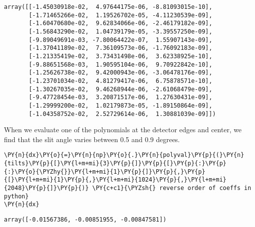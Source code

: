 \begin{tcolorbox}[breakable, size=fbox, boxrule=.5pt, pad at break*=1mm, opacityfill=0]
\begin{Verbatim}[commandchars=\\\{\}]
array([[-1.45030918e-02,  4.97644175e-06, -8.81093015e-10],
       [-1.71465266e-02,  1.19526702e-05, -4.11230539e-09],
       [-1.60470680e-02,  9.62834066e-06, -2.46179182e-09],
       [-1.56843290e-02,  1.04739179e-05, -3.39557250e-09],
       [-9.89049691e-03, -7.80064422e-07,  1.55907143e-09],
       [-1.37041189e-02,  7.36109573e-06, -1.76092183e-09],
       [-1.21335419e-02,  3.73431498e-06,  3.62338925e-10],
       [-9.88651568e-03,  1.90595104e-06,  9.70922842e-10],
       [-1.25626738e-02,  9.42000943e-06, -3.06478176e-09],
       [-1.23701034e-02,  4.81279417e-06,  6.75878571e-10],
       [-1.30267035e-02,  9.46268944e-06, -2.61068479e-09],
       [-9.47728454e-03,  3.20871517e-06,  1.27630431e-09],
       [-1.29999200e-02,  1.02179873e-05, -1.89150864e-09],
       [-1.04358752e-02,  2.52729614e-06,  1.30881039e-09]])
\end{Verbatim}
\end{tcolorbox}

When we evaluate one of the polynomials at the detector edges and
center, we find that the slit angle varies between 0.5 and 0.9 degrees.

\begin{tcolorbox}[breakable, size=fbox, boxrule=1pt, pad at break*=1mm,colback=cellbackground, colframe=cellborder]
\begin{Verbatim}[commandchars=\\\{\}]
\PY{n}{dx}\PY{o}{=}\PY{n}{np}\PY{o}{.}\PY{n}{polyval}\PY{p}{(}\PY{n}{tilts}\PY{p}{[}\PY{l+m+mi}{3}\PY{p}{]}\PY{p}{[}\PY{p}{:}\PY{p}{:}\PY{o}{\PYZhy{}}\PY{l+m+mi}{1}\PY{p}{]}\PY{p}{,}\PY{p}{[}\PY{l+m+mi}{1}\PY{p}{,}\PY{l+m+mi}{1024}\PY{p}{,}\PY{l+m+mi}{2048}\PY{p}{]}\PY{p}{)} \PY{c+c1}{\PYZsh{} reverse order of coeffs in python}
\PY{n}{dx}
\end{Verbatim}
\end{tcolorbox}

\begin{tcolorbox}[breakable, size=fbox, boxrule=.5pt, pad at break*=1mm, opacityfill=0]
\begin{Verbatim}[commandchars=\\\{\}]
array([-0.01567386, -0.00851955, -0.00847581])
\end{Verbatim}
\end{tcolorbox}

